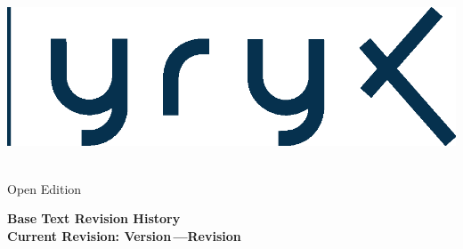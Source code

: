 \setcounter{page}{1}
\thispagestyle{empty}


\vspace{-3em}
\begin{center}
	\includegraphics[width=.4\textwidth]{figures/lyryxlogo-blue.eps}
\end{center}

\vspace{-2em}

\begin{center}
 {\fontsize{24pt}{22pt}\headerfont \textcolor{primarycolour}{\booktitle\;\booksubtitle}} \\ 
{\fontsize{16pt}{20pt}\subheaderfont \textcolor{secondarycolour}{Open Edition}} 

\medskip

\end{center}

\setlength{\parskip}{0pt}

\begin{center}
\fontsize{12pt}{14pt}\subheaderfont\textcolor{secondarycolour}{\textbf{Base Text Revision History \\ \smallskip  Current Revision: Version\,\version \enskip---\enskip Revision\,\revision }}
\end{center}

